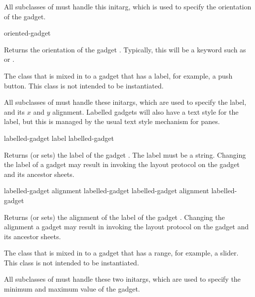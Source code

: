 
All subclasses of  must handle this initarg,
which is used to specify the orientation of the gadget.

 {oriented-gadget}

Returns the orientation of the gadget .  Typically, this
will be a keyword such as  or .



The class that is mixed in to a gadget that has a label, for example, a push
button.  This class is not intended to be instantiated.


All subclasses of  must handle these initargs, which
are used to specify the label, and its $x$ and $y$ alignment.  Labelled gadgets
will also have a text style for the label, but this is managed by the usual text
style mechanism for panes.

 {labelled-gadget}
 {label labelled-gadget}

Returns (or sets) the label of the gadget .  The label must
be a string.  Changing the label of a gadget may result in invoking the layout
protocol on the gadget and its ancestor sheets.

 {labelled-gadget}
 {alignment labelled-gadget}
 {labelled-gadget}
 {alignment labelled-gadget}

Returns (or sets) the alignment of the label of the gadget
.  Changing the alignment a gadget may result in invoking
the layout protocol on the gadget and its ancestor sheets.



The class that is mixed in to a gadget that has a range, for example, a slider.
This class is not intended to be instantiated.


All subclasses of  must handle these two initargs, which
are used to specify the minimum and maximum value of the gadget.

